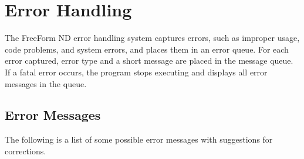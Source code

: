 %
%

\chapter{Error Handling}
\label{ff,errors}

The FreeForm ND error handling system captures errors, such as
improper usage, code problems, and system errors, and places them in
an error queue. For each error captured, error type and a short
message are placed in the message queue. If a fatal error occurs, the
program stops executing and displays all error messages in the queue.

\section{Error Messages}

The following is a list of some possible error messages with
suggestions for corrections.

